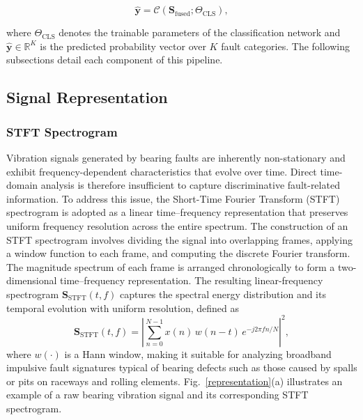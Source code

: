 \documentclass[journal]{IEEEtran}
\begin{document}
\begin{equation}
\hat{\boldsymbol{y}} = \mathcal{C}(\boldsymbol{S}_{\mathrm{fused}}; \Theta_{\mathrm{CLS}}),
\label{eq:pipeline_cls}
\end{equation}

where $\Theta_{\mathrm{CLS}}$ denotes the trainable parameters of the classification network and $\hat{\boldsymbol{y}} \in \mathbb{R}^{K}$ is the predicted probability vector over $K$ fault categories. The following subsections detail each component of this pipeline.

\subsection{Signal Representation}

\subsubsection{STFT Spectrogram}

Vibration signals generated by bearing faults are inherently non-stationary and exhibit frequency-dependent characteristics that evolve over time. Direct time-domain analysis is therefore insufficient to capture discriminative fault-related information. To address this issue, the Short-Time Fourier Transform (STFT) spectrogram is adopted as a linear time--frequency representation that preserves uniform frequency resolution across the entire spectrum. The construction of an STFT spectrogram involves dividing the signal into overlapping frames, applying a window function to each frame, and computing the discrete Fourier transform. The magnitude spectrum of each frame is arranged chronologically to form a two-dimensional time--frequency representation. The resulting linear-frequency spectrogram $\boldsymbol{S}_{\mathrm{STFT}}(t, f)$ captures the spectral energy distribution and its temporal evolution with uniform resolution, defined as
\begin{equation}
\boldsymbol{S}_{\mathrm{STFT}}(t, f) = \left| \sum_{n=0}^{N-1} x(n) \, w(n - t) \, e^{-j 2\pi f n / N} \right|^2,
\label{eq:stft}
\end{equation}
where $w(\cdot)$ is a Hann window, making it suitable for analyzing broadband impulsive fault signatures typical of bearing defects such as those caused by spalls or pits on raceways and rolling elements. Fig.~\ref{representation}(a) illustrates an example of a raw bearing vibration signal and its corresponding STFT spectrogram.
\end{document}
